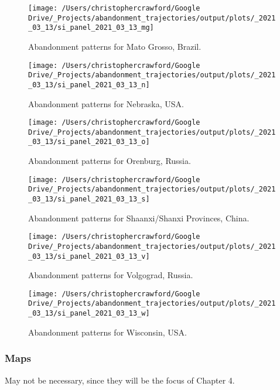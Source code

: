 \documentclass[
]{article}
\begin{document}
\begin{figure}
\texttt{[image: /Users/christophercrawford/Google Drive/\_Projects/abandonment\_trajectories/output/plots/\_2021\_03\_13/si\_panel\_2021\_03\_13\_mg]} \caption{Abandonment patterns for Mato Grosso, Brazil.}\label{fig:panel-mg}
\end{figure}

\begin{figure}
\texttt{[image: /Users/christophercrawford/Google Drive/\_Projects/abandonment\_trajectories/output/plots/\_2021\_03\_13/si\_panel\_2021\_03\_13\_n]} \caption{Abandonment patterns for Nebraska, USA.}\label{fig:panel-n}
\end{figure}

\begin{figure}
\texttt{[image: /Users/christophercrawford/Google Drive/\_Projects/abandonment\_trajectories/output/plots/\_2021\_03\_13/si\_panel\_2021\_03\_13\_o]} \caption{Abandonment patterns for Orenburg, Russia.}\label{fig:panel-o}
\end{figure}

\begin{figure}
\texttt{[image: /Users/christophercrawford/Google Drive/\_Projects/abandonment\_trajectories/output/plots/\_2021\_03\_13/si\_panel\_2021\_03\_13\_s]} \caption{Abandonment patterns for Shaanxi/Shanxi Provinces, China.}\label{fig:panel-s}
\end{figure}

\begin{figure}
\texttt{[image: /Users/christophercrawford/Google Drive/\_Projects/abandonment\_trajectories/output/plots/\_2021\_03\_13/si\_panel\_2021\_03\_13\_v]} \caption{Abandonment patterns for Volgograd, Russia.}\label{fig:panel-v}
\end{figure}

\begin{figure}
\texttt{[image: /Users/christophercrawford/Google Drive/\_Projects/abandonment\_trajectories/output/plots/\_2021\_03\_13/si\_panel\_2021\_03\_13\_w]} \caption{Abandonment patterns for Wisconsin, USA.}\label{fig:panel-w}
\end{figure}

\hypertarget{maps}{%
\subsubsection{Maps}\label{maps}}

May not be necessary, since they will be the focus of Chapter 4.
\end{document}
